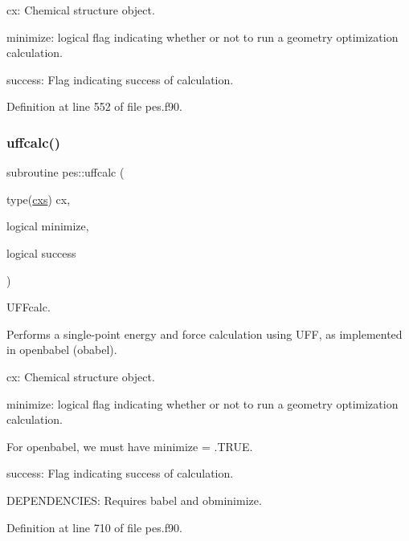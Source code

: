 \begin{DoxyItemize}
\item cx\+: Chemical structure object.
\item minimize\+: logical flag indicating whether or not to run a geometry optimization calculation.
\item success\+: Flag indicating success of calculation. 
\end{DoxyItemize}

Definition at line 552 of file pes.\+f90.

\mbox{\label{namespacepes_a3c31f7c822b9f71d668245f72cc453b0}} 
\subsubsection{\texorpdfstring{uffcalc()}{uffcalc()}}
{\footnotesize\ttfamily subroutine pes\+::uffcalc (\begin{DoxyParamCaption}\item[{type(\mbox{\hyperlink{structchemstr_1_1cxs}{cxs}})}]{cx,  }\item[{logical}]{minimize,  }\item[{logical}]{success }\end{DoxyParamCaption})}



U\+F\+Fcalc. 

Performs a single-\/point energy and force calculation using U\+FF, as implemented in openbabel (obabel).


\begin{DoxyItemize}
\item cx\+: Chemical structure object.
\item minimize\+: logical flag indicating whether or not to run a geometry optimization calculation.

For openbabel, we must have minimize = .T\+R\+UE.
\item success\+: Flag indicating success of calculation.
\end{DoxyItemize}

D\+E\+P\+E\+N\+D\+E\+N\+C\+I\+ES\+: Requires babel and obminimize. 

Definition at line 710 of file pes.\+f90.

\mbox{\label{namespacepes_a04f0797f2fcc51b261d97b0b2f014254}} 
